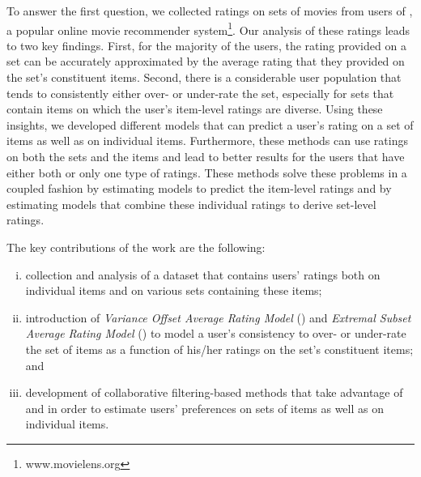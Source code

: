 To answer the first question, we collected ratings on sets
of movies from users of \ML, a popular online movie recommender
system\footnote{www.movielens.org}. 
Our analysis of these ratings leads to two key findings. First, for the majority
of the users, the rating provided on a set can be accurately approximated by the
average rating that they provided on the set's constituent items. Second, there
is a considerable user population that tends to consistently either over- or
under-rate the set, especially for sets that contain items on which the user's
item-level ratings are diverse.
Using these insights, we developed different  models that can predict
a user's rating on a set of items as well as on individual items. 
Furthermore, these methods can use ratings on both the sets and the items and
lead to better results for the users that have either both or only one type of
ratings.
These methods solve
these problems in a coupled fashion by estimating models to predict the item-level
ratings and by estimating models that combine these individual ratings to derive
set-level ratings.



The key contributions of the work are the following:
\begin{enumerate}[(i)]
\item collection and analysis of a dataset that contains users' ratings both on
individual items and on various sets containing these items;
%
\item introduction of \emph{Variance Offset Average Rating Model} (\VO) and
\emph{Extremal Subset Average Rating Model} (\ES) to
model a user's consistency to over- or under-rate the set of items as a function of his/her ratings on the set's constituent items; and
%
\item development of collaborative filtering-based methods that take
advantage of \VO and \ES in order to estimate users' preferences on sets of items as well as
on individual items.
\end{enumerate}


